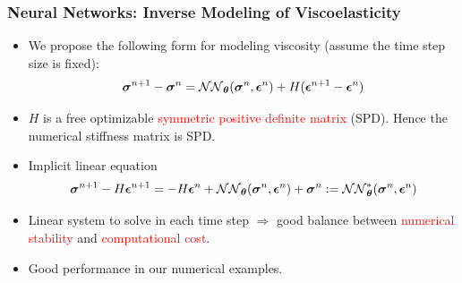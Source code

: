 \documentclass[usenames,dvipsnames]{beamer}
\newcommand{\bt}[0]{\bm{\theta}}
\begin{document}
\begin{frame}
	\frametitle{Neural Networks: Inverse Modeling of Viscoelasticity}
	
	\begin{itemize}
		\item We propose the following form for modeling viscosity (assume the time step size is fixed):
		$$\bsigma^{n+1} - \bsigma^{n} = \mathcal{NN}_{\bt} (\bsigma^n, \bepsilon^n) + H (\bepsilon^{n+1} - \bepsilon^n)$$
	\end{itemize}
	\begin{itemize}
		\item $H$ is a free optimizable \textcolor{red}{symmetric positive definite matrix} (SPD). Hence the numerical stiffness matrix is SPD.
		\item Implicit linear equation
		$$\bsigma^{n+1} - H \bepsilon^{n+1} = - H \bepsilon^n
		+ \mathcal{NN}_{\bt} (\bsigma^n, \bepsilon^n) + \bsigma^{n}:= \mathcal{NN}_{\bt}^* (\bsigma^n, \bepsilon^n)$$
		\item Linear system to solve in each time step $\Rightarrow$ good balance between \textcolor{red}{numerical stability} and \textcolor{red}{computational cost}.
		\item Good performance in our numerical examples.
	\end{itemize}
\end{frame}

\end{document}
